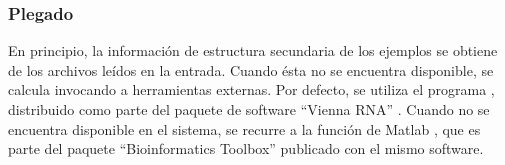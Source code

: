 %
\subsubsection{Plegado}
%
En principio, la información de estructura secundaria de los ejemplos
se obtiene de los archivos leídos en la entrada.
Cuando ésta no se encuentra disponible, se calcula invocando a
herramientas externas.
Por defecto, se utiliza el programa , distribuido como
parte del paquete de software ``Vienna RNA'' \cite{vienna}.
Cuando  no se encuentra disponible en el sistema, se
recurre a la función de Matlab , que es parte del
paquete ``Bioinformatics Toolbox'' publicado con el mismo software.
